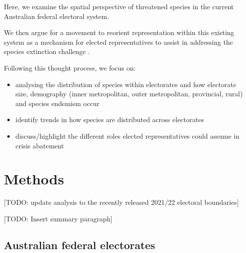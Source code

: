 \documentclass[a4paper,11pt]{article}
\begin{document}
Here, we examine the spatial perspective of threatened species in the current Australian federal electoral system.

We then argue for a movement to reorient representation within this existing system as a mechanism for elected representatives to assist in addressing the species extinction challenge \cite{burkeSpeciesBordersPolitical2020}.

Following this thought process, we focus on:
\begin{itemize}
    \item analysing the distribution of species within electorates and how electorate size, demography (inner metropolitan, outer metropolitan, provincial, rural) and species endemism occur
    \item identify trends in how species are distributed across electorates
    \item discuss/highlight the different roles elected representatives could assume in crisis abatement
\end{itemize}

\section{Methods}
[TODO: update analysis to the recently released 2021/22 electoral boundaries]

[TODO: Insert summary paragraph]

\subsection{Australian federal electorates}
\end{document}
